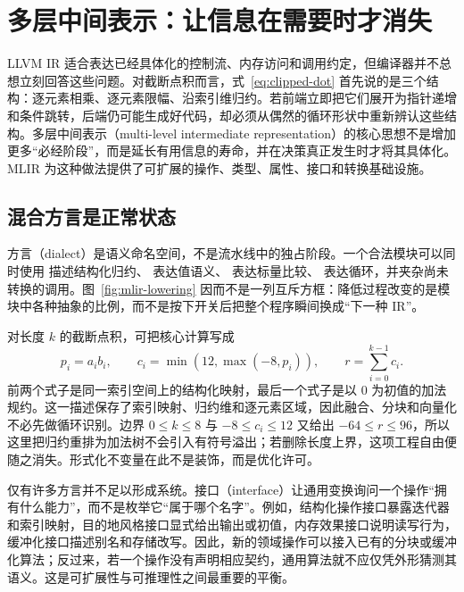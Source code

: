\section{多层中间表示：让信息在需要时才消失}
\label{sec:mlir}

LLVM IR 适合表达已经具体化的控制流、内存访问和调用约定，但编译器并不总想立刻回答这些问题。对截断点积而言，式~\eqref{eq:clipped-dot} 首先说的是三个结构：逐元素相乘、逐元素限幅、沿索引维归约。若前端立即把它们展开为指针递增和条件跳转，后端仍可能生成好代码，却必须从偶然的循环形状中重新辨认这些结构。多层中间表示（multi-level intermediate representation）的核心思想不是增加更多“必经阶段”，而是延长有用信息的寿命，并在决策真正发生时才将其具体化。MLIR 为这种做法提供了可扩展的操作、类型、属性、接口和转换基础设施\cite{adv-mlir-cgo,adv-mlir-langref}。



\subsection{混合方言是正常状态}

方言（dialect）是语义命名空间，不是流水线中的独占阶段。一个合法模块可以同时使用  描述结构化归约、 表达值语义、 表达标量比较、 表达循环，并夹杂尚未转换的调用。图~\ref{fig:mlir-lowering} 因而不是一列互斥方框：降低过程改变的是模块中各种抽象的比例，而不是按下开关后把整个程序瞬间换成“下一种 IR”。

对长度 $k$ 的截断点积，可把核心计算写成
\begin{equation}
  p_i=a_i b_i,\qquad
  c_i=\min(12,\max(-8,p_i)),\qquad
  r=\sum_{i=0}^{k-1}c_i .
  \label{eq:mlir-map-reduce}
\end{equation}
前两个式子是同一索引空间上的结构化映射，最后一个式子是以 $0$ 为初值的加法规约。这一描述保存了索引映射、归约维和逐元素区域，因此融合、分块和向量化不必先做循环识别。边界 $0\le k\le8$ 与 $-8\le c_i\le12$ 又给出 $-64\le r\le96$，所以这里把归约重排为加法树不会引入有符号溢出；若删除长度上界，这项工程自由便随之消失。形式化不变量在此不是装饰，而是优化许可。

仅有许多方言并不足以形成系统。接口（interface）让通用变换询问一个操作“拥有什么能力”，而不是枚举它“属于哪个名字”。例如，结构化操作接口暴露迭代器和索引映射，目的地风格接口显式给出输出或初值，内存效果接口说明读写行为，缓冲化接口描述别名和存储改写\cite{adv-mlir-interfaces,adv-mlir-linalg-rationale}。因此，新的领域操作可以接入已有的分块或缓冲化算法；反过来，若一个操作没有声明相应契约，通用算法就不应仅凭外形猜测其语义。这是可扩展性与可推理性之间最重要的平衡。

